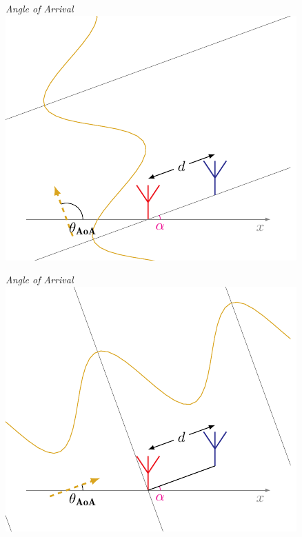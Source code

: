     \begin{frame}{\textit{Angle of Arrival}}
        \centering\includegraphics{../pictures/AoA_3_new}
    \end{frame}

    \begin{frame}{\textit{Angle of Arrival}}
        \centering\includegraphics{../pictures/AoA_4_new}
    \end{frame}

